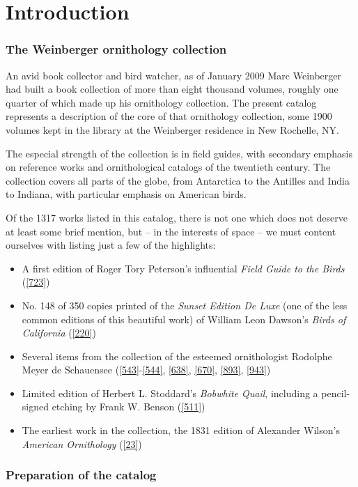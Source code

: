 \chapter*{Introduction}

\subsection*{The Weinberger ornithology collection}

An avid book collector and bird watcher, as of January 2009 Marc Weinberger had
built a book collection of more than eight thousand volumes, roughly one quarter
of which made up his ornithology collection. The present catalog represents a
description of the core of that ornithology collection, some 1900 volumes kept in
the library at the Weinberger residence in New Rochelle, NY.

The especial strength of the collection is in field guides, with secondary emphasis
on reference works and ornithological catalogs of the twentieth century.
The collection covers all parts of the globe, from Antarctica to the Antilles and
India to Indiana, with particular emphasis on American birds.

Of the 1317 works listed in this catalog, there is not one which does not deserve
at least some brief mention, but -- in the interests of space -- we must content
ourselves with listing just a few of the highlights:
\begin{itemize}
\item A first edition of Roger Tory Peterson's influential \textit{Field Guide to
	the Birds} (\ref{723})
\item No. 148 of 350 copies printed of the \textit{Sunset Edition De Luxe} (one
	of the less common editions of this beautiful work) of William Leon Dawson's
	\textit{Birds of California} (\ref{220})
\item Several items from the collection of the esteemed ornithologist Rodolphe
	Meyer de Schauensee (\ref{543}-\ref{544}, \ref{638}, \ref{670}, \ref{893}, \ref{943})
\item Limited edition of Herbert L. Stoddard's \textit{Bobwhite Quail}, including
	a pencil-signed etching by Frank W. Benson (\ref{511})
\item The earliest work in the collection, the 1831 edition of Alexander Wilson's
	\textit{American Ornithology} (\ref{23})
\end{itemize}

\subsection*{Preparation of the catalog}

